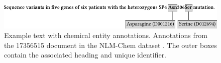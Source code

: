 \begin{figure}[!tb]
\begin{center}
\includegraphics[width=\textwidth]{img/chemical-entity-annotations/v1/img.pdf}
\caption[Example text with chemical entity annotations.]{Example text with chemical entity annotations. Annotations from the  17356515 document in the NLM-Chem dataset \parencite{islamaj2021a}. The outer boxes contain the associated  heading and unique identifier.}
\label{fig:chemical-entity-annotations}
\end{center}
\end{figure}
